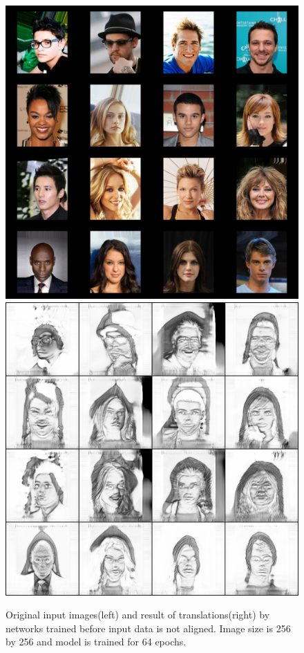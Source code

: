 \begin{figure}[ht]
\begin{center}
    \includegraphics[scale=0.16]{Graphics/pic2ske_origin_before_clean.png}
    \includegraphics[scale=0.16]{Graphics/pic2ske_result_before_clean.png}
    \end{center}
    \caption{Original input images(left) and result of translations(right) by networks trained before input data is not aligned. Image size is 256 by 256 and model is trained for 64 epochs.}\label{FIG:before_refinement}
\end{figure}

